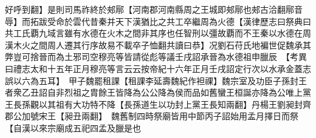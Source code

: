 好呼到翻】是則司馬祚終於郟鄏【河南郡河南縣周之王城即郟鄏也郟古洽翻鄏音辱】而拓跋受命於雲代昔秦并天下漢猶比之共工卒繼周為火德【漢律歷志曰祭典曰共工氏覇九域言雖有水德在火木之間非其序也任智刑以彊故覇而不王秦以水德在周漢木火之間周人遷其行序故易不載卒子恤翻共讀曰恭】况劉石苻氏地褊世促魏承其弊豈可捨晉而為土邪司空穆亮等皆請從彪等議壬戌詔承晉為水德祖申臘辰　【考異曰禮志太和十五年正月穆亮等言云云按帝紀十六年正月壬戌詔定行次以水承金蓋志誤以六為五耳】　甲子魏罷租課【租課李延壽魏紀作袒祼】魏宗室及功臣子孫封王者衆乙丑詔自非烈祖之胄餘王皆降為公公降為侯而品如舊蠻王桓誕亦降為公唯上黨王長孫觀以其祖有大功特不降【長孫道生以功封上黨王長知兩翻】丹楊王劉昶封齊郡公加號宋王【昶丑兩翻】　魏舊制四時祭廟皆用中節丙子詔始用孟月擇日而祭【自漢以來宗廟成五祀四孟及臘是也